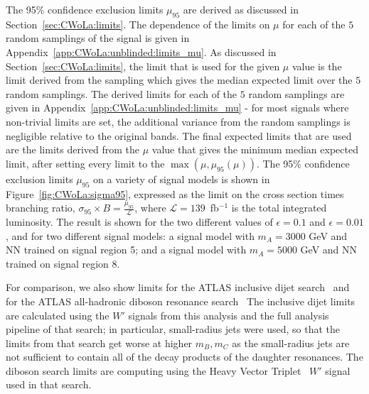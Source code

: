 The 95\% confidence exclusion limits $\mu_{95}$ are derived as discussed in Section~\ref{sec:CWoLa:limits}.
The dependence of the limits on $\mu$ for each of the $5$ random samplings of the signal is given in Appendix~\ref{app:CWoLa:unblinded:limits_mu}.
As discussed in Section~\ref{sec:CWoLa:limits}, the limit that is used for the given $\mu$ value is the limit derived from the sampling which gives the median expected limit over the $5$ random samplings.
The derived limits for each of the $5$ random samplings are given in Appendix~\ref{app:CWoLa:unblinded:limits_mu} - for most signals where non-trivial limits are set, the additional variance from the random samplings is negligible relative to the original bands.
The final expected limits that are used are the limits derived from the $\mu$ value that gives the minimum median expected limit, after setting every limit to the $\max(\mu,\mu_{95}(\mu))$. 
The 95\% confidence exclusion limits $\mu_{95}$ on a variety of signal models is shown in Figure~\ref{fig:CWoLa:sigma95}, expressed as the limit on the cross section times branching ratio, $\sigma_{95}\times B = \frac{\mu_{95}}{\mathcal{L}}$, where $\mathcal{L} = 139$~fb$^{-1}$ is the total integrated luminosity.
The result is shown for the two different values of $\epsilon=0.1$ and $\epsilon=0.01$, and for two different signal models: a signal model with $m_A=3000$ GeV and NN trained on signal region 5; and a signal model with $m_A=5000$ GeV and NN trained on signal region 8.

For comparison, we also show limits for the ATLAS inclusive dijet search~\cite{Aad:2019hjw} and for the ATLAS all-hadronic diboson resonance search~\cite{Aad:2019fbh}
The inclusive dijet limits are calculated using the $W'$ signals from this analysis and the full analysis pipeline of that search;
in particular, small-radius jets were used, so that the limits from that search get worse at higher $m_B,m_C$ as the small-radius jets are not sufficient to contain all of the decay products of the daughter resonances.
The diboson search limits are computing using the Heavy Vector Triplet~\cite{Pappadopulo:2014qza} $W'$ signal used in that search.

